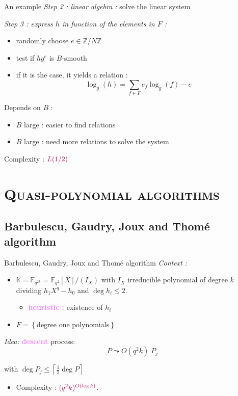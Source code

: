 \documentclass[xcolor=x11names,compress]{beamer}
\theoremstyle{break}
\theoremstyle{sc}
\theoremstyle{definition}
\theoremstyle{remark}
\begin{document}
\begin{frame}{An example}
  \emph{Step 2 : linear algebra :} solve the linear system
  
  \emph{Step 3 : express $h$ in function of the elements in $F$ :}
  \begin{itemize}
     \item randomly choose $e\in \mathbb{Z}/N\mathbb{Z}$
    \item test if $hg^e$ is $B$-smooth
    \item if it is the case, it yields a relation  :
     \[
      \log_g(h) = \sum_{f\in F}e_f\log_g(f) - e
      \]
  \end{itemize}

 Depends on $B$ :
  \begin{itemize}
    \item $B$ large : easier to find relations
    \item $B$ large : need more relations to solve the system
  \end{itemize}
  Complexity : $\textcolor{purple}{L(1/2)}$

\end{frame}

\section{\scshape Quasi-polynomial algorithms} 
\subsection{Barbulescu, Gaudry, Joux and Thomé algorithm}

\begin{frame}{Barbulescu, Gaudry, Joux and Thomé algorithm}
  \emph{Context :}
  \begin{itemize}
    \item $\mathbb{K}=\mathbb{F}_{q^{2k}}=\mathbb{F}_{q^2}[X]/(I_X)$ with $I_X$ irreducible
      polynomial of degree $k$ dividing $h_1X^q-h_0$ and $\deg h_i\leq 2$.
      \begin{itemize}
        \item \textcolor{violet}{\textbf{heuristic :}} existence of $h_i$
      \end{itemize}
    \item $F=\left\{  \text{degree one polynomials}\right\}$ 
\end{itemize}
\emph{Idea:} \textcolor{violet}{\textbf{descent}} process:
  \[
    P \leadsto O(q^2k)\; P_j   
  \]
    
    with $\deg P_j \leq \left\lceil\frac{1}{2}\deg P\right\rceil$

    \begin{itemize}
      \item Complexity : $\textcolor{purple}{(q^2k)^{O(\log k)}}$.
    \end{itemize}

\end{frame}
\end{document}
